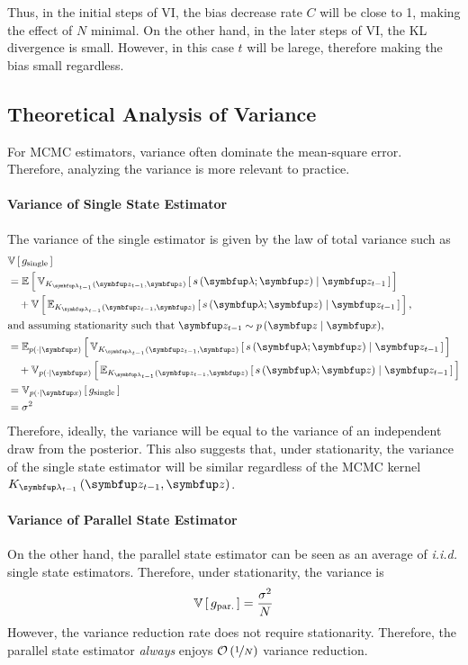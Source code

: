 Thus, in the initial steps of VI, the bias decrease rate \(C\) will be close to 1, making the effect of \(N\) minimal.
On the other hand, in the later steps of VI, the KL divergence is small.
However, in this case \(t\) will be larege, therefore making the bias small regardless.

\subsection{Theoretical Analysis of Variance}
For MCMC estimators, variance often dominate the mean-square error.
Therefore, analyzing the variance is more relevant to practice.

\paragraph{Variance of Single State Estimator}
The variance of the single estimator is given by the law of total variance such as
\begin{align}
  &\V{g_{\text{single}}} \nonumber \\
  &= \E{ \Vsub{K_{\vlambda_{t-1}}\left(\vz_{t-1}, \vz\right)}{ s\left(\vlambda; \vz\right) \mid \vz_{t-1} }} \nonumber \\
  &\quad + \V{ \Esub{K_{\vlambda_{t-1}}\left(\vz_{t-1}, \vz\right)}{ s\left(\vlambda; \vz\right) \mid \vz_{t-1} } }, \\
  \intertext{and assuming stationarity such that \(\vz_{t-1} \sim p\left(\vz \mid \vx\right)\),}
  &= \Esub{p\left(\cdot \mid\vx \right)}{ \Vsub{K_{\vlambda_{t-1}}\left(\vz_{t-1}, \vz\right)}{ s\left(\vlambda; \vz\right) \mid \vz_{t-1} }} \nonumber\\
  &\quad + \Vsub{p\left(\cdot \mid\vx \right)}{ \Esub{K_{\vlambda_{t-1}}\left(\vz_{t-1}, \vz\right)}{ s\left(\vlambda; \vz\right) \mid \vz_{t-1} } } \\
  &= \Vsub{p\left(\cdot\mid\vx \right)}{g_{\text{single}}} \\
  &= \sigma^2
\end{align}
Therefore, ideally, the variance will be equal to the variance of an independent draw from the posterior.
This also suggests that, under stationarity, the variance of the single state estimator will be similar regardless of the MCMC kernel \(K_{\vlambda_{t-1}}\left(\vz_{t-1}, \vz\right)\).

\paragraph{Variance of Parallel State Estimator}
On the other hand, the parallel state estimator can be seen as an average of \textit{i.i.d.} single state estimators.
Therefore, under stationarity, the variance is
\begin{align}
  \mathbb{V}\left[\,g_{\text{par.}}\,\right] = \frac{\sigma^2}{N}
\end{align}
However, the variance reduction rate does not require stationarity.
Therefore, the parallel state estimator \textit{always} enjoys \(\mathcal{O}\left(\nicefrac{1}{N}\right)\) variance reduction.

